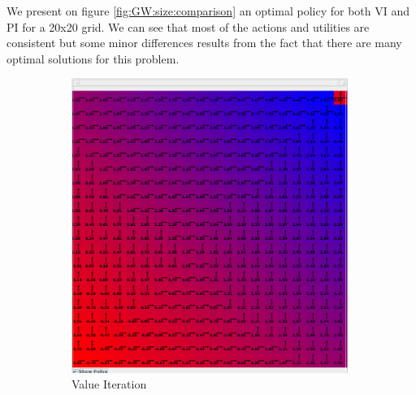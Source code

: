 \documentclass[10pt, twocolumn]{article}
\begin{document}
				We present on figure \ref{fig:GW:size:comparison} an optimal policy for both VI and PI for a 20x20 grid. We can see that most of the actions and utilities are consistent but some minor differences results from the fact that there are many optimal solutions for this problem.

				\begin{figure}[]
					\centering
					\begin{subfigure}[t]{0.24\textwidth}
						\centering
						\includegraphics[width=\textwidth]{../graphics/GridWorld_20_vi_size.png}
						\caption{Value Iteration}
						\label{fig:GW:size:VI}
					\end{subfigure}
					\begin{subfigure}[t]{0.24\textwidth}
						\centering

\end{subfigure}
\end{figure}
\end{document}
